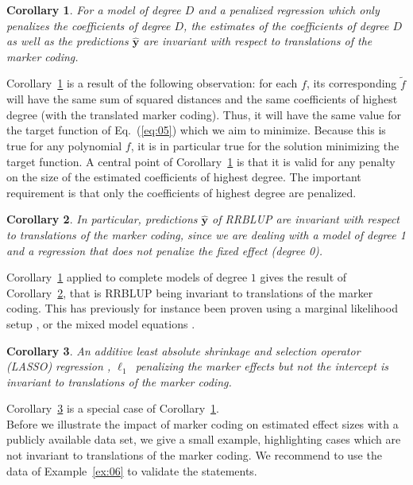 \documentclass{bmcart}
\newtheorem{corollary}{Corollary}
\newcommand{\0}{\mathbf{0}}
\newcommand{\y}{\mathbf{y}}
\begin{document}
	\begin{corollary}\label{cor:02} For a model of degree $D$ and a penalized regression which only penalizes the coefficients of degree $D$, the estimates of the coefficients of degree $D$ as well as the predictions $\hat{\y}$ are invariant with respect to translations of the marker coding. 
	\end{corollary}

Corollary~\ref{cor:02} is a result of the following observation: for each $f$, its corresponding $\tilde{f}$ will have the same sum of squared distances and the same coefficients of highest degree (with the translated marker coding). Thus, it will have the same value for the target function of Eq.~(\ref{eq:05}) which we aim to minimize.
Because this is true for any polynomial $f$, it is in particular true for the solution minimizing the target function. 
A central point of Corollary~\ref{cor:02} is that it is valid for any penalty on the size of the estimated coefficients of highest degree. The important requirement is that only the coefficients of highest degree are penalized.


	\begin{corollary}\label{cor:03}	In particular, predictions $\hat{\y}$ of RRBLUP are invariant with respect to translations of the marker coding, since we are dealing with a model of degree 1 and a regression that does not penalize the fixed effect (degree 0). 
	\end{corollary}
Corollary~\ref{cor:02} applied to complete models of degree $1$ gives the result of Corollary~\ref{cor:03}, that is RRBLUP being invariant to translations of the marker coding.
This has previously for instance been proven using a marginal likelihood setup \cite{stranden11}, or the mixed model equations \cite{Martini17}. 


		\begin{corollary}\label{cor:04} An additive least absolute shrinkage and selection operator (LASSO) regression \cite{tibshirani96}, $\ell_1$~penalizing the marker effects but not the intercept is invariant to translations of the marker coding. 
\end{corollary}
Corollary~\ref{cor:04} is a special case of Corollary~\ref{cor:02}. \\

Before we illustrate the impact of marker coding on estimated effect sizes with a publicly available data set, we give a small example, highlighting cases which are not invariant to translations of the marker coding.
We recommend to use the data of Example~\ref{ex:06} to validate the statements.\\
\end{document}
